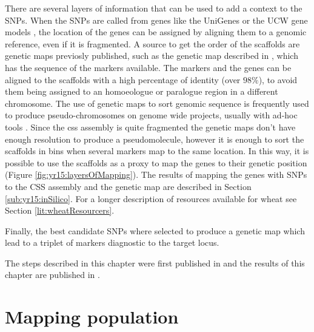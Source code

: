 There are several layers of information that can be used to add a context to the SNPs. 
When the SNPs are called from genes like the UniGenes \citep{PontiusJUWagnerL2002} or the UCW gene models \citep{Krasileva2013}, the location of the genes can be assigned by aligning them to a genomic reference, even if it is fragmented. 
A source to get the order of the scaffolds are genetic maps previosly published, such as the genetic map described in \citet{Wang2014}, which has the sequence of the markers available.
The markers and the genes can be aligned to the scaffolds with a high percentage of identity (over $98\%$), to avoid them being assigned to an homoeologue or paralogue region in a different chromosome.
The use of genetic maps to sort genomic sequence is frequently used to produce pseudo-chromosomes on genome wide projects, usually with ad-hoc tools \citep{Tang2015}.
Since the \acrshort{css} assembly is quite fragmented the genetic maps don't have enough resolution to produce a pseudomolecule, however it is enough to sort the scaffolds in bins when several markers map to the same location. 
In this way, it is possible to use the scaffolds as a proxy to map the genes to their genetic position (Figure \ref{fig:yr15:layersOfMapping}).
The results of mapping the genes with SNPs to the CSS assembly and the genetic map are described in Section \ref{sub:yr15:inSilico}. 
For a longer description of resources available for wheat see Section \ref{lit:wheatResourcers}. 

Finally, the best candidate SNPs where selected to produce a genetic map which lead to a triplet of markers diagnostic to the target locus. 

The steps described in this chapter were first published in \citet{Ramirez-Gonzalez2015c} and the results of this chapter are published in \citet{Ramirez-Gonzalez2015b}.

\section{Mapping population}


